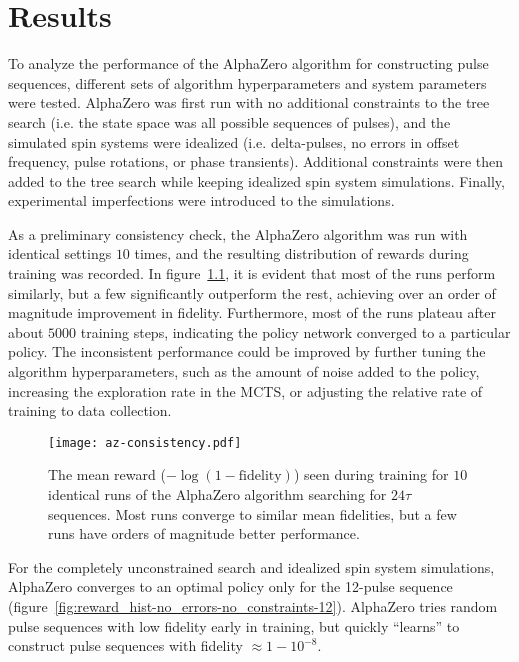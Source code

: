\chapter{Results}



To analyze the performance of the AlphaZero algorithm for constructing pulse sequences, different sets of algorithm hyperparameters and system parameters were tested. AlphaZero was first run with no additional constraints to the tree search (i.e. the state space was all possible sequences of pulses), and the simulated spin systems were idealized (i.e. delta-pulses, no errors in offset frequency, pulse rotations, or phase transients). Additional constraints were then added to the tree search while keeping idealized spin system simulations. Finally, experimental imperfections were introduced to the simulations.



As a preliminary consistency check, the AlphaZero algorithm was run with identical settings $10$ times, and the resulting distribution of rewards during training was recorded. In figure~\ref{fig:az-consistency}, it is evident that most of the runs perform similarly, but a few significantly outperform the rest, achieving over an order of magnitude improvement in fidelity. Furthermore, most of the runs plateau after about $5000$ training steps, indicating the policy network converged to a particular policy. The inconsistent performance could be improved by further tuning the algorithm hyperparameters, such as the amount of noise added to the policy, increasing the exploration rate in the MCTS, or adjusting the relative rate of training to data collection.

\begin{figure}
    \centering
    \texttt{[image: az-consistency.pdf]}
    \caption{The mean reward ($-\log(1-\text{fidelity})$) seen during training for $10$ identical runs of the AlphaZero algorithm searching for $24\tau$ sequences. Most runs converge to similar mean fidelities, but a few runs have orders of magnitude better performance.}
    \label{fig:az-consistency}
\end{figure}


For the completely unconstrained search and idealized spin system simulations, AlphaZero converges to an optimal
policy only for the 12-pulse sequence (figure~\ref{fig:reward_hist-no_errors-no_constraints-12}). AlphaZero tries random pulse sequences with low fidelity early in training, but quickly ``learns'' to construct pulse sequences with fidelity $\approx 1 - 10^{-8}$.

